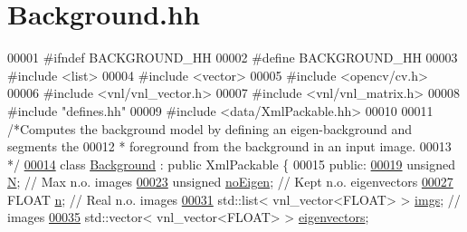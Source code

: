 \hypertarget{Background_8hh_source}{
\section{Background.hh}
}

\begin{DoxyCode}
00001 \textcolor{preprocessor}{#ifndef BACKGROUND\_HH}
00002 \textcolor{preprocessor}{}\textcolor{preprocessor}{#define BACKGROUND\_HH}
00003 \textcolor{preprocessor}{}\textcolor{preprocessor}{#include <list>}
00004 \textcolor{preprocessor}{#include <vector>}
00005 \textcolor{preprocessor}{#include <opencv/cv.h>}
00006 \textcolor{preprocessor}{#include <vnl/vnl\_vector.h>}
00007 \textcolor{preprocessor}{#include <vnl/vnl\_matrix.h>}
00008 \textcolor{preprocessor}{#include "defines.hh"}
00009 \textcolor{preprocessor}{#include <data/XmlPackable.hh>}
00010 
00011 \textcolor{comment}{/*Computes the background model by defining an eigen-background and segments the}
00012 \textcolor{comment}{ * foreground from the background in an input image.}
00013 \textcolor{comment}{ */}
\hypertarget{Background_8hh_source_l00014}{}\hyperlink{classBackground}{00014} \textcolor{keyword}{class }\hyperlink{classBackground}{Background} : \textcolor{keyword}{public} XmlPackable \{
00015         \textcolor{keyword}{public}:
\hypertarget{Background_8hh_source_l00019}{}\hyperlink{classBackground_a8cc2e7240164328fdc3f0e5e21032c56}{00019}                 \textcolor{keywordtype}{unsigned} \hyperlink{classBackground_a8cc2e7240164328fdc3f0e5e21032c56}{N};                \textcolor{comment}{// Max n.o. images}
\hypertarget{Background_8hh_source_l00023}{}\hyperlink{classBackground_af6be8e29dfd74ef1409ead7fab675e32}{00023} \textcolor{comment}{}                \textcolor{keywordtype}{unsigned} \hyperlink{classBackground_af6be8e29dfd74ef1409ead7fab675e32}{noEigen};                \textcolor{comment}{// Kept n.o. eigenvectors}
\hypertarget{Background_8hh_source_l00027}{}\hyperlink{classBackground_aeab71244afb687f16d8c4f5ee9d6ef0e}{00027} \textcolor{comment}{}                FLOAT \hyperlink{classBackground_aeab71244afb687f16d8c4f5ee9d6ef0e}{n};                  \textcolor{comment}{// Real n.o. images}
\hypertarget{Background_8hh_source_l00031}{}\hyperlink{classBackground_a7f417fb9a54a478886c049912c2b74ef}{00031} \textcolor{comment}{}                std::list< vnl\_vector<FLOAT> > \hyperlink{classBackground_a7f417fb9a54a478886c049912c2b74ef}{imgs}; \textcolor{comment}{// images}
\hypertarget{Background_8hh_source_l00035}{}\hyperlink{classBackground_a4b377022ff3181c71dbf4bad6a4836b3}{00035} \textcolor{comment}{}                std::vector< vnl\_vector<FLOAT> > \hyperlink{classBackground_a4b377022ff3181c71dbf4bad6a4836b3}{eigenvectors};

\end{DoxyCode}
